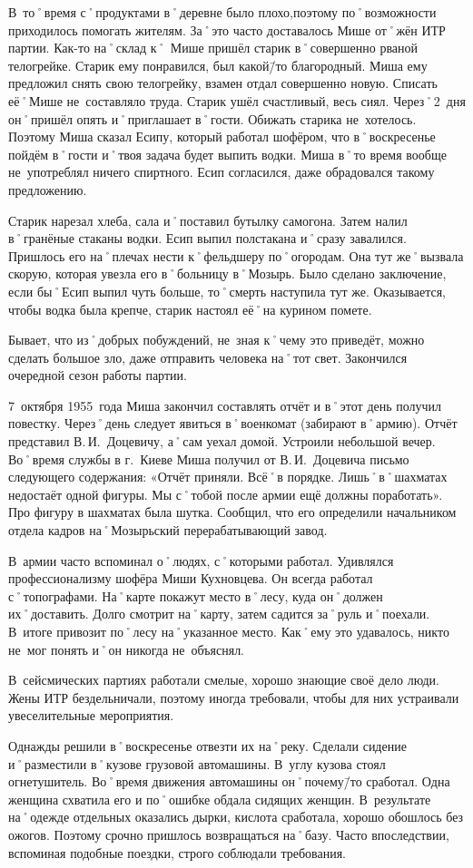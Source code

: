 В~то˚время с˚продуктами в˚деревне было плохо,поэтому по˚возможности приходилось помогать жителям. За˚это часто доставалось Мише от˚жён ИТР партии. Как-то на˚склад к˚ Мише пришёл старик в˚совершенно рваной телогрейке. Старик ему понравился, был какой\=/то благородный. Миша ему предложил снять свою телогрейку, взамен отдал совершенно новую. Списать её˚Мише не~составляло труда. Старик ушёл счастливый, весь сиял. Через˚2~дня он˚пришёл опять и˚приглашает в˚гости. Обижать старика не~хотелось. Поэтому Миша сказал Есипу, который работал шофёром, что в˚воскресенье пойдём в˚гости и˚твоя задача будет выпить водки. Миша в˚то время вообще не~употреблял ничего спиртного. Есип согласился, даже обрадовался такому предложению. 

Старик нарезал хлеба, сала и˚поставил бутылку самогона. Затем налил в˚гранёные стаканы водки. Есип выпил полстакана и˚сразу завалился. Пришлось его на˚плечах нести к˚фельдшеру по˚огородам. Она тут же˚вызвала скорую, которая увезла его в˚больницу в˚Мозырь. Было сделано заключение, если бы˚Есип выпил чуть больше, то˚смерть наступила тут же. Оказывается, чтобы водка была крепче, старик настоял её˚на курином помете.

Бывает, что из˚добрых побуждений, не~зная к˚чему это приведёт, можно сделать большое зло, даже отправить человека на˚тот свет. Закончился очередной сезон работы партии.

7~октября 1955~года Миша закончил составлять отчёт и в˚этот день получил повестку. Через˚день следует явиться в˚военкомат (забирают в˚армию). Отчёт представил В.\,И.~Доцевичу, а˚сам уехал домой. Устроили небольшой вечер. Во˚время службы в г.~Киеве Миша получил от В.\,И.~Доцевича письмо следующего содержания: «Отчёт приняли. Всё˚в порядке. Лишь˚в˚шахматах недостаёт одной фигуры. Мы с˚тобой после армии ещё должны поработать». Про фигуру в шахматах была шутка. Сообщил, что его определили начальником отдела кадров на˚Мозырьский перерабатывающий завод.

В~армии часто вспоминал о˚людях, с˚которыми работал. Удивлялся профессионализму шофёра Миши Кухновцева. Он всегда работал с˚топографами. На˚карте покажут место в˚лесу, куда он˚должен их˚доставить. Долго смотрит на˚карту, затем садится за˚руль и˚поехали. В~итоге привозит по˚лесу на˚указанное место. Как˚ему это удавалось, никто не~мог понять и˚он никогда не~объяснял.

В~сейсмических партиях работали смелые, хорошо знающие своё дело люди. Жены ИТР бездельничали, поэтому иногда требовали, чтобы для них устраивали увеселительные мероприятия.

Однажды решили в˚воскресенье отвезти их на˚реку. Сделали сидение и˚разместили в˚кузове грузовой автомашины. В~углу кузова стоял огнетушитель. Во˚время движения автомашины он˚почему\=/то сработал. Одна женщина схватила его и по˚ошибке обдала сидящих женщин. В~результате на˚одежде отдельных оказались дырки, кислота сработала, хорошо обошлось без ожогов. Поэтому срочно пришлось возвращаться на˚базу. Часто впоследствии, вспоминая подобные поездки, строго соблюдали требования.